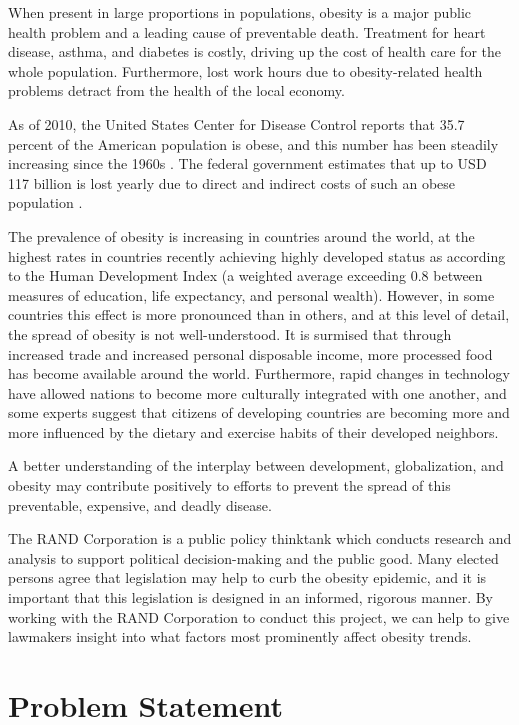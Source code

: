 \documentclass[12pt,letterpaper]{article}
\theoremstyle{definition}
\begin{document}
When present in large proportions in populations, obesity is a major public health problem and a leading cause of preventable death. Treatment for heart disease, asthma, and diabetes is costly, driving up the cost of health care for the whole population. Furthermore, lost work hours due to obesity-related health problems detract from the health of the local economy.

As of 2010, the United States Center for Disease Control reports that 35.7 percent of the American population is obese, and this number has been steadily increasing since the 1960s \cite{prevalence}. The federal government estimates that up to USD 117 billion is lost yearly due to direct and indirect costs of such an obese population \cite{prevalence}.

The prevalence of obesity is increasing in countries around the world, at the highest rates in countries recently achieving highly developed status as according to the Human Development Index (a weighted average exceeding 0.8 between measures of education, life expectancy, and personal wealth). However, in some countries this effect is more pronounced than in others, and at this level of detail, the spread of obesity is not well-understood. It is surmised that through increased trade and increased personal disposable income, more processed food has become available around the world. Furthermore, rapid changes in technology have allowed nations to become more culturally integrated with one another, and some experts suggest that citizens of developing countries are becoming more and more influenced by the dietary and exercise habits of their developed neighbors.

A better understanding of the interplay between development, globalization, and obesity may contribute positively to efforts to prevent the spread of this preventable, expensive, and deadly disease.

The RAND Corporation is a public policy thinktank which conducts research and analysis to support political decision-making and the public good. Many elected persons agree that legislation may help to curb the obesity epidemic, and it is important that this legislation is designed in an informed, rigorous manner. By working with the RAND Corporation to conduct this project, we can help to give lawmakers insight into what factors most prominently affect obesity trends.

\section{Problem Statement}
\end{document}
